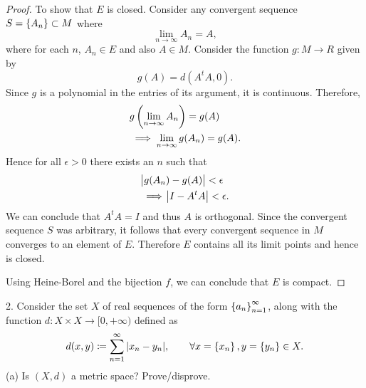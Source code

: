 \documentclass{article}
\begin{document}
\begin{proof}
To show that $E$ is closed. Consider
any convergent sequence $S = \cbr{A_n} \subset M$ where
%
\begin{equation*}
    \lim_{n \to \infty} A_n = A
    ,
\end{equation*}
%
where for each $n$, $A_n \in E$ and also $A \in M$. Consider the
function $g: M \to R$ given by
%
\begin{equation*}
    g(A) = d(A^t A, 0)
    .
\end{equation*}
%
Since $g$ is a polynomial in the entries of its argument, it is continuous. Therefore,
%
\begin{align*}
    &g \del{\lim_{n \to \infty} A_n} = g(A) \\
    &\implies \lim_{n \to \infty} g(A_n) = g(A)
    .
\end{align*}
%
Hence for all $\epsilon > 0$ there exists an $n$ such that
%
\begin{align*}
    &\envert{g(A_n) - g(A)} < \epsilon \\
    &\implies \envert{I - A^t A } < \epsilon
    .
\end{align*}
%
We can conclude that $A^t A = I$ and thus $A$ is orthogonal. Since the
convergent sequence $S$ was arbitrary, it follows that every convergent
sequence in $M$ converges to an element of $E$. Therefore $E$ contains
all its limit points and hence is closed.

Using Heine-Borel and the bijection $f$, we can conclude that $E$ is
compact.

\end{proof}

\newpage

2. Consider the set $X$ of real sequences of the form $\cbr{a_n}_{ n=
   1}^\infty$, along with the function $d: X \times X \rightarrow [0,
   +\infty)$ defined as
%
\begin{equation*}
    d(x, y) \coloneqq \sum_{n = 1}^\infty |x_n - y_n|,
    \qquad \forall x = \cbr{x_n}, y = \cbr{y_n} \in X
    .
\end{equation*}
%
(a) Is $(X,d)$ a metric space? Prove/disprove.
\end{document}
